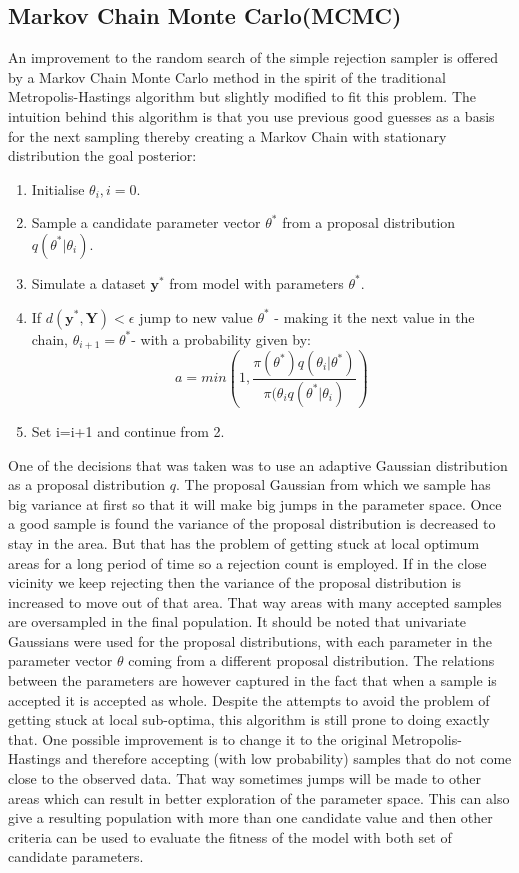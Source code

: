 \documentclass[12pt,a4paper,titlepage]{article}
\begin{document}
\subsection{Markov Chain Monte Carlo(MCMC)}
An improvement to the random search of the simple rejection sampler is offered by a Markov Chain Monte Carlo method in the spirit of the traditional Metropolis-Hastings algorithm but slightly modified to fit this problem\cite{marjoram2003markov}. The intuition behind this algorithm is that you use previous good guesses as a basis for the next sampling thereby creating a Markov Chain with stationary distribution the goal posterior:
\begin{enumerate}[noitemsep]
\item{Initialise $\theta_{i}, i = 0$.}
\item{Sample a candidate parameter vector $\theta^*$ from a proposal distribution $q(\theta^* | \theta_{i})$.}
\item{Simulate a dataset $\mathbf{y}^*$ from model with parameters $\theta^*$.}
\item{If $d(\mathbf{y}^*, \mathbf{Y}) < \epsilon$ jump to new value $\theta^*$ - making it the next value in the chain, $\theta_{i+1} = \theta^*$- with a probability given by:
\begin{equation*}
a = min \left(1, \frac{\pi(\theta^*)q(\theta_{i} | \theta^*)}{\pi(\theta_{i}q(\theta^*|\theta_{i})}\right)
\end{equation*}}
\item{Set i=i+1 and continue from 2.}
\end{enumerate}
One of the decisions that was taken was to use an adaptive Gaussian distribution as a proposal distribution $q$. The proposal Gaussian from which we sample has big variance at first so that it will make big jumps in the parameter space. Once a good sample is found the variance of the proposal distribution is decreased to stay in the area. But that has the problem of getting stuck at local optimum areas for a long period of time so a rejection count is employed. If in the close vicinity we keep rejecting then the variance of the proposal distribution is increased to move out of that area. That way areas with many accepted samples are oversampled in the final population. It should be noted that univariate Gaussians were used for the proposal distributions, with each parameter in the parameter vector $\theta$ coming from a different proposal distribution. The relations between the parameters are however captured in the fact that when a sample is accepted it is accepted as whole. Despite the attempts to avoid the problem of getting stuck at local sub-optima, this algorithm is still prone to doing exactly that. One possible improvement is to change it to the original Metropolis-Hastings and therefore accepting (with low probability) samples that do not come close to the observed data. That way sometimes jumps will be made to other areas which can result in better exploration of the parameter space. This can also give a resulting population with more than one candidate value and then other criteria can be used to evaluate the fitness of the model with both set of candidate parameters. 
\end{document}
